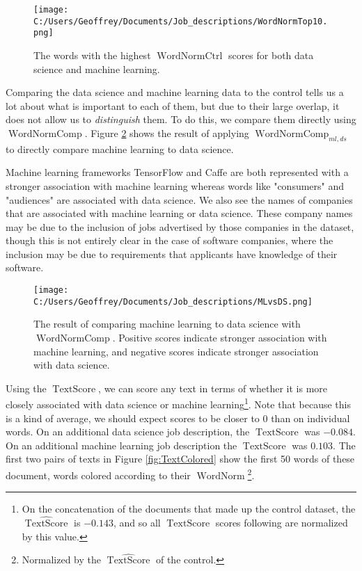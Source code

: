 \documentclass[12pt]{article}
\DeclareMathOperator{\WN}{WordNorm}
\DeclareMathOperator{\WNt}{WordNormCtrl}
\DeclareMathOperator{\WNp}{WordNormComp}
\DeclareMathOperator{\TS}{TextScore}
\begin{document}
\begin{figure}[h]
\begin{center}
\texttt{[image: C:/Users/Geoffrey/Documents/Job\_descriptions/WordNormTop10.png]}
\end{center}
\caption{\label{fig:WNt} The words with the highest $\WNt$ scores for both data science and machine learning.}
\end{figure}

Comparing the data science and machine learning data to the control tells us a lot about what is important to each of them, but due to their large overlap, it does not allow us to \textit{distinguish} them. To do this, we compare them directly using $\WNp$. Figure \ref{fig:WNp} shows the result of applying $\WNp_{ml,ds}$ to directly compare machine learning to data science.

Machine learning frameworks TensorFlow and Caffe are both represented with a stronger association with machine learning whereas words like "consumers" and "audiences" are associated with data science. We also see the names of companies that are associated with machine learning or data science. These company names may be due to the inclusion of jobs advertised by those companies in the dataset, though this is not entirely clear in the case of software companies, where the inclusion may be due to requirements that applicants have knowledge of their software. 

\begin{figure}[h]
\begin{center}
\texttt{[image: C:/Users/Geoffrey/Documents/Job\_descriptions/MLvsDS.png]}
\end{center}
\caption{\label{fig:WNp} The result of comparing machine learning to data science with $\WNp$. Positive scores indicate stronger association with machine learning, and negative scores indicate stronger association with data science.}
\end{figure}

Using the $\TS$, we can score any text in terms of whether it is more closely associated with data science or machine learning\footnote{On the concatenation of the documents that made up the control dataset, the $\widehat{\TS}$ is $-0.143$, and so all $\TS$ scores following are normalized by this value.}. Note that because this is a kind of average, we should expect scores to be closer to 0 than on individual words. On an additional data science job description, the $\TS$ was $-0.084$. On an additional machine learning job description the $\TS$ was $0.103$. The first two pairs of texts in Figure \ref{fig:TextColored} show the first 50 words of these document, words colored according to their $\WN$\footnote{Normalized by the $\widehat{\TS}$ of the control.}.
\end{document}
